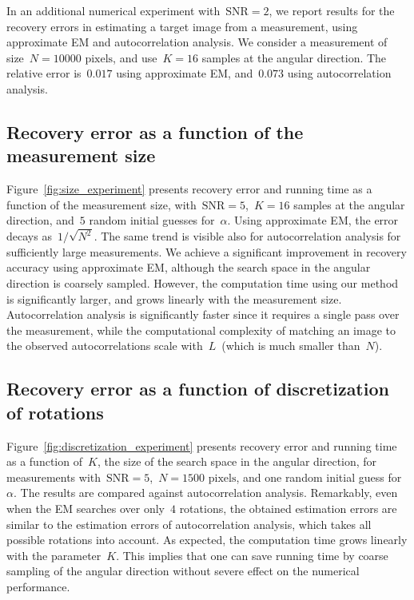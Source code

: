 \documentclass{article}
\begin{document}
In an additional numerical experiment with~$\text{SNR} = 2$, we report results for the recovery errors in estimating a target image from a measurement, using approximate EM and autocorrelation analysis. We consider a measurement of size~$N = 10000 \text{ pixels}$, and use~\mbox{$K = 16$} samples at the angular direction. The relative error is~$\text{0.017}$ using approximate EM, and~$0.073$ using autocorrelation analysis.

\subsection{Recovery error as a function of the measurement size}
\label{subsec:exp_size}
Figure~\ref{fig:size_experiment} presents recovery error and running time as a function of the measurement size, with~\mbox{$\text{SNR} = 5$},~\mbox{$K = 16$} samples at the angular direction, and~$5$ random initial guesses for~$\alpha$. Using approximate EM, the error decays \mbox{as~$1 / \sqrt{N^2}$}. The same trend is visible also for autocorrelation analysis for sufficiently large measurements. We achieve a significant improvement in recovery accuracy using approximate EM, although the search space in the angular direction is coarsely sampled. However, the computation time using our method is significantly larger, and grows linearly with the measurement size. Autocorrelation analysis is significantly faster since it requires a single pass over the measurement, while the computational complexity of matching an image to the observed autocorrelations scale with~$L$~(which is much smaller than~$N$).

\subsection{Recovery error as a function of discretization of rotations}
\label{subsec:exp_discretization}
Figure~\ref{fig:discretization_experiment} presents recovery error and running time as a function of~$K$, the size of the search space in the angular direction, for measurements with~\mbox{$\text{SNR} = 5$},~\mbox{$N = 1500 \text{ pixels}$}, and one random initial guess for~$\alpha$. The results are compared against autocorrelation analysis. Remarkably, even when the EM searches over only~$4$ rotations, the obtained estimation errors are similar to the estimation errors of autocorrelation analysis, which takes all possible rotations into account. As expected, the computation time grows linearly with the parameter~$K$. This implies that one can save running time by coarse sampling of the angular direction without severe effect on the numerical performance.
\end{document}
